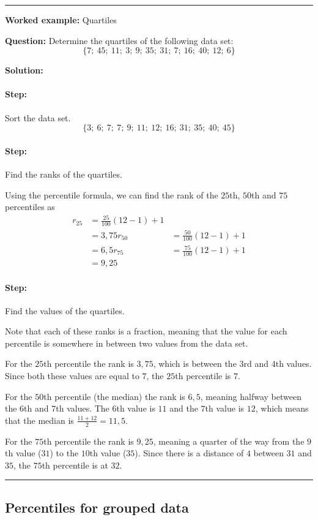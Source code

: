 \documentclass[a4paper,11pt]{report}
\newenvironment{wex}[3]%
{\rule{\linewidth}{0.5mm}
\textbf{Worked example:} #1

\textbf{Question:} #2

\textbf{Solution:} #3}%
{\rule{\linewidth}{0.5mm}}
\newcommand{\westep}[1]{\paragraph{Step:} #1}
\begin{document}
\begin{wex}{Quartiles}{
    Determine the quartiles of the following data set:
    \begin{equation}
      \{7;\ 45;\ 11;\ 3;\ 9;\ 35;\ 31;\ 7;\ 16;\ 40;\ 12;\ 6\}
    \end{equation}
}{
    \westep{Sort the data set.}
    \begin{equation}
      \{3;\ 6;\ 7;\ 7;\ 9;\ 11;\ 12;\ 16;\ 31;\ 35;\ 40;\ 45\}
    \end{equation}

    \westep{Find the ranks of the quartiles.}

    Using the percentile formula, we can find the rank of the $25$th,
    $50$th and $75$ percentiles as
    \begin{align}
      r_{25} &= \frac{25}{100}\left(12-1\right)+1 \\
            &= 3,75
      r_{50} &= \frac{50}{100}\left(12-1\right)+1 \\
            &= 6,5
      r_{75} &= \frac{75}{100}\left(12-1\right)+1 \\
            &= 9,25
    \end{align}

    \westep{Find the values of the quartiles.}

    Note that each of these ranks is a fraction, meaning that the
    value for each percentile is somewhere in between two values from
    the data set.

    For the $25$th percentile the rank is $3,75$, which is between
    the $3$rd and $4$th values. Since both these values are equal to
    $7$, the $25$th percentile is $7$.

    For the $50$th percentile (the median) the rank is $6,5$, meaning
    halfway between the $6$th and $7$th values. The $6$th value is
    $11$ and the $7$th value is $12$, which means that the median is
    $\frac{11+12}{2} = 11,5$.

    For the $75$th percentile the rank is $9,25$, meaning a quarter of
    the way from the $9$th value ($31$) to the $10$th value
    ($35$). Since there is a distance of $4$ between $31$ and $35$,
    the $75$th percentile is at $32$.

 }
\end{wex}

\subsection{Percentiles for grouped data}
\end{document}
